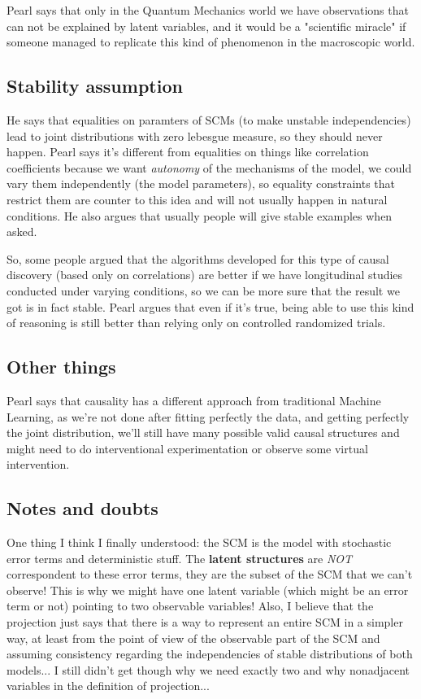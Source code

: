 Pearl says that only in the Quantum Mechanics world we have observations that can not be explained by latent variables, and it would be a "scientific miracle" if someone managed to replicate this kind of phenomenon in the macroscopic world.

\subsection{Stability assumption}

He says that equalities on paramters of SCMs (to make unstable independencies) lead to joint distributions with zero lebesgue measure, so they should never happen. Pearl says it's different from equalities on things like correlation coefficients because we want \textit{autonomy} of the mechanisms of the model, we could vary them independently (the model parameters), so equality constraints that restrict them are counter to this idea and will not usually happen in natural conditions. He also argues that usually people will give stable examples when asked.

So, some people argued that the algorithms developed for this type of causal discovery (based only on correlations) are better if we have longitudinal studies conducted under varying conditions, so we can be more sure that the result we got is in fact stable. Pearl argues that even if it's true, being able to use this kind of reasoning is still better than relying only on controlled randomized trials.


\subsection{Other things}

Pearl says that causality has a different approach from traditional Machine Learning, as we're not done after fitting perfectly the data, and getting perfectly the joint distribution, we'll still have many possible valid causal structures and might need to do interventional experimentation or observe some virtual intervention.

\subsection{Notes and doubts}

One thing I think I finally understood: the SCM is the model with stochastic error terms and deterministic stuff. The \textbf{latent structures} are \textit{NOT} correspondent to these error terms, they are the subset of the SCM that we can't observe! This is why we might have one latent variable (which might be an error term or not) pointing to two observable variables! Also, I believe that the projection just says that there is a way to represent an entire SCM in a simpler way, at least from the point of view of the observable part of the SCM and assuming consistency regarding the independencies of stable distributions of both models... I still didn't get though why we need exactly two and why nonadjacent variables in the definition of projection...

